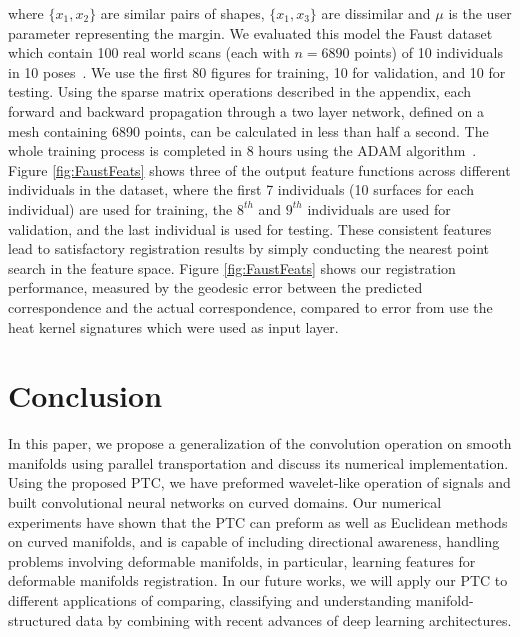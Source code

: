 \documentclass[10pt,twocolumn,letterpaper]{article}
\begin{document}
where $\{x_1,x_2\}$ are similar pairs of shapes, $\{x_1,x_3\}$ are dissimilar and $\mu$ is the user parameter representing the margin. We evaluated this model the Faust dataset which contain 100 real world scans (each with $n = 6890$ points) of 10 individuals in 10 poses~\cite{bogo2014faust}. We use the first 80 figures for training, 10 for validation, and 10 for testing. Using the sparse matrix operations described in the appendix, each forward and backward propagation through a two layer network, defined on a mesh containing 6890 points, can be calculated in less than half a second. The whole training process is completed in 8 hours using the ADAM algorithm~\cite{kingma2014adam}.  Figure \ref{fig:FaustFeats} shows three of the output feature functions across different individuals in the dataset, where the first 7 individuals (10 surfaces for each individual) are used for training, the $8^{th}$ and $9^{th}$ individuals are used for validation, and the last individual is used for testing. These consistent features lead to satisfactory registration results by simply conducting the nearest point search in the feature space.  Figure \ref{fig:FaustFeats} shows our registration performance, measured by the geodesic error between the predicted correspondence and the actual correspondence, compared to error from use the heat kernel signatures which were used as input layer. 





\section{Conclusion}
\label{sec:conclusion}
In this paper, we propose a generalization of the convolution operation on smooth manifolds using parallel transportation and discuss its numerical implementation. Using the proposed PTC, we have preformed wavelet-like operation of signals and built convolutional neural networks on curved domains. Our numerical experiments have shown that the PTC can preform as well as Euclidean methods on curved manifolds, and is capable of including directional awareness, handling problems involving deformable manifolds, in particular, learning features for deformable manifolds registration. In our future works, we will apply our PTC to different applications of comparing, classifying and understanding manifold-structured data by combining with recent advances of deep learning architectures.
\end{document}
